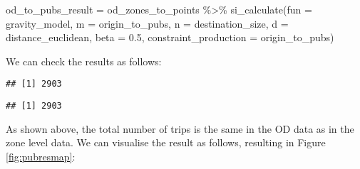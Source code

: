 \documentclass[11pt,letterpaper]{article}
\newenvironment{Shaded}{\begin{snugshade}}{\end{snugshade}}
\newcommand{\AttributeTok}[1]{\textcolor[rgb]{0.77,0.63,0.00}{#1}}
\newcommand{\FloatTok}[1]{\textcolor[rgb]{0.00,0.00,0.81}{#1}}
\newcommand{\FunctionTok}[1]{\textcolor[rgb]{0.00,0.00,0.00}{#1}}
\newcommand{\NormalTok}[1]{#1}
\newcommand{\OtherTok}[1]{\textcolor[rgb]{0.56,0.35,0.01}{#1}}
\newcommand{\SpecialCharTok}[1]{\textcolor[rgb]{0.00,0.00,0.00}{#1}}
\begin{document}
\begin{Shaded}
\begin{Highlighting}[]
\NormalTok{od\_to\_pubs\_result }\OtherTok{=}\NormalTok{ od\_zones\_to\_points }\SpecialCharTok{\%\textgreater{}\%} 
  \FunctionTok{si\_calculate}\NormalTok{(}\AttributeTok{fun =}\NormalTok{ gravity\_model, }
               \AttributeTok{m =}\NormalTok{ origin\_to\_pubs,}
               \AttributeTok{n =}\NormalTok{ destination\_size,}
               \AttributeTok{d =}\NormalTok{ distance\_euclidean,}
               \AttributeTok{beta =} \FloatTok{0.5}\NormalTok{,}
               \AttributeTok{constraint\_production =}\NormalTok{ origin\_to\_pubs)}
\end{Highlighting}
\end{Shaded}

We can check the results as follows:

\begin{Shaded}
\end{Shaded}

\begin{verbatim}
## [1] 2903
\end{verbatim}

\begin{Shaded}
\end{Shaded}

\begin{verbatim}
## [1] 2903
\end{verbatim}

As shown above, the total number of trips is the same in the OD data as in the zone level data.
We can visualise the result as follows, resulting in Figure \ref{fig:pubresmap}:
\end{document}
